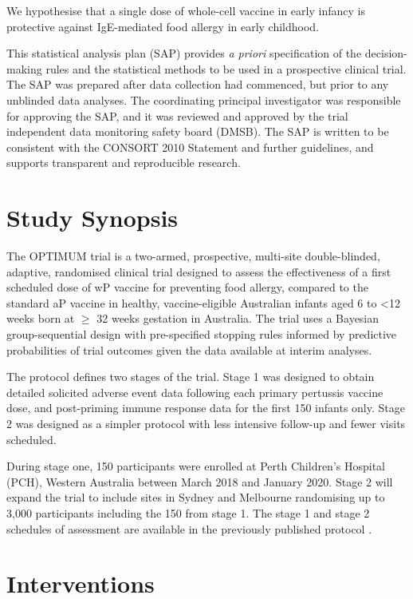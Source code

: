 \documentclass{bmcart}
\begin{document}
We hypothesise that a single dose of whole-cell vaccine in early infancy is protective against IgE-mediated food allergy in early childhood.

This statistical analysis plan (SAP) provides \textit{a priori} specification of the decision-making rules and the statistical methods to be used in a prospective clinical trial. 
The SAP was prepared after data collection had commenced, but prior to any unblinded data analyses. 
The coordinating principal investigator was responsible for approving the SAP, and it was reviewed and approved by the trial independent data monitoring safety board (DMSB). 
The SAP is written to be consistent with the CONSORT 2010 Statement and further guidelines, and supports transparent and reproducible research.

\section*{Study Synopsis}

The OPTIMUM trial is a two-armed, prospective, multi-site double-blinded, adaptive, randomised clinical trial designed to assess the effectiveness of a first scheduled dose of wP vaccine for preventing food allergy, compared to the standard aP vaccine in healthy, vaccine-eligible Australian infants aged 6 to \textless12 weeks born at \(\geq\) 32 weeks gestation in Australia.
The trial uses a Bayesian group-sequential design with pre-specified stopping rules informed by predictive probabilities of trial outcomes given the data available at interim analyses.

The protocol defines two stages of the trial.
Stage 1 was designed to obtain detailed solicited adverse event data following each primary pertussis vaccine dose, and post-priming immune response data for the first 150 infants only. 
Stage 2 was designed as a simpler protocol with less intensive follow-up and fewer visits scheduled.

During stage one, 150 participants were enrolled at Perth Children's Hospital (PCH), Western Australia between March 2018 and January 2020.
Stage 2 will expand the trial to include sites in Sydney and Melbourne randomising up to 3,000 participants including the 150 from stage 1.
The stage 1 and stage 2 schedules of assessment are available in the previously published protocol \cite{perez2020}.

\section*{Interventions}
\end{document}
